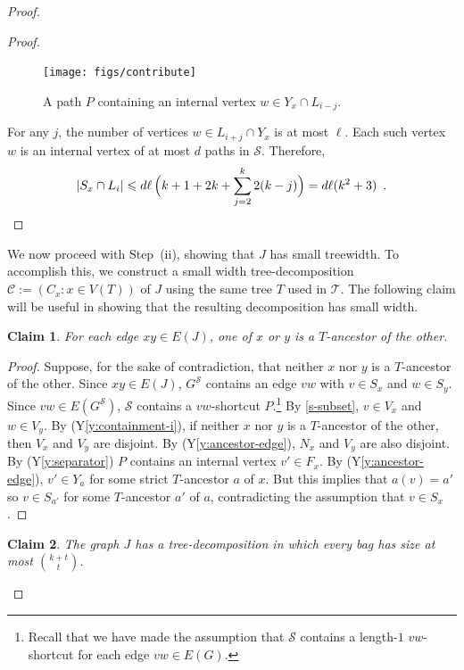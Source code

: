 \documentclass{patmorin}
\theoremstyle{plain}
\newtheorem{clm}{Claim}
\theoremstyle{definition}
\newcommand{\yref}[1]{(Y\ref{y:#1})}
\renewcommand{\SS}{\mathcal{S}}
\renewcommand{\le}{\leqslant}
\begin{document}
\begin{proof}
\begin{proof}
  \begin{figure}[htbp]
    \begin{center}
      \texttt{[image: figs/contribute]}
    \end{center}
    \caption{A path $P$ containing an internal vertex $w\in Y_x\cap L_{i-j}$.}
    \label{contribute}
  \end{figure}


  For any $j$, the number of vertices $w\in L_{i+j}\cap Y_x$ is at most $\ell$. Each such vertex $w$ is an internal vertex of at most $d$ paths in $\SS$. Therefore,
  \[  |S_x\cap L_i|\le d\ell  \, \Big(k+1 + 2k + \sum_{j=2}^k 2(k-j)\Big) %
      = d\ell(k^2 +3) \enspace . \qedhere
  \]
\end{proof}

We now proceed with Step~(ii), showing that $J$ has small treewidth. To accomplish this, we construct a small width tree-decomposition $\mathcal{C}:=(C_x:x\in V(T))$ of $J$ using the same tree $T$ used in $\mathcal{T}$.  The following claim will be useful in showing that the resulting decomposition has small width.

\begin{clm}\label{i-ancestor}
  For each edge $xy\in E(J)$, one of $x$ or $y$ is a $T$-ancestor of the other.
\end{clm}

\begin{proof}
  Suppose, for the sake of contradiction, that neither $x$ nor $y$ is a $T$-ancestor of the other.  Since $xy\in E(J)$, $G^\SS$ contains an edge $vw$ with $v\in S_x$ and $w\in S_y$.  Since $vw\in E(G^{\SS})$,  $\SS$ contains a $vw$-shortcut $P$.\footnote{Recall that we have made the assumption that $\SS$ contains a length-$1$ $vw$-shortcut for each edge $vw\in E(G)$.}  By \cref{s-subset}, $v\in V_x$ and $w\in V_y$.  By \yref{containment-i}, if neither $x$ nor $y$ is a $T$-ancestor of the other, then $V_x$ and $V_y$ are disjoint.  By \yref{ancestor-edge}, $N_x$ and $V_y$ are also disjoint.  By \yref{separator} $P$ contains an internal vertex $v'\in F_x$.  By \yref{ancestor-edge}, $v'\in Y_a$ for some strict $T$-ancestor $a$ of $x$.  But this implies that $a(v)=a'$ so $v\in S_{a'}$ for some $T$-ancestor $a'$ of $a$, contradicting the assumption that $v\in S_x$.
\end{proof}

\begin{clm}
\label{general-bag-size}
The graph $J$ has a tree-decomposition in which every bag has size at most $\binom{k+t}{t}$.
\end{clm}


\end{proof}
\end{document}

